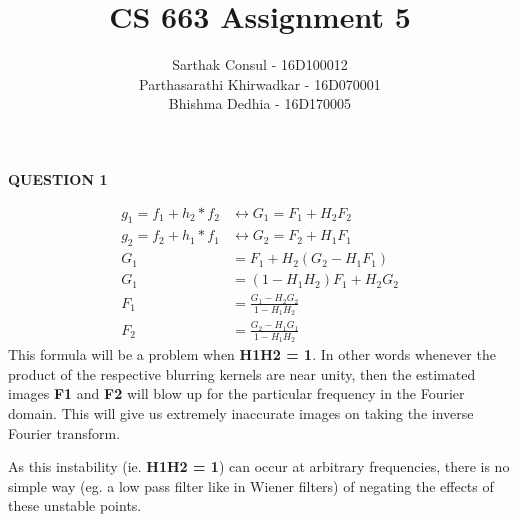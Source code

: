 \documentclass{article}
\title{CS 663 Assignment 5}
\author{Sarthak Consul - 16D100012\\
Parthasarathi Khirwadkar - 16D070001\\
Bhishma Dedhia - 16D170005}
\date{}
\begin{document}
\maketitle

\centerline{\textbf{\large\large{{{QUESTION 1}}}}}
\begin{align*}
    g_1 = f_1 + h_2*f_2 &\longleftrightarrow G_1 = F_1 + H_2F_2\\
    g_2 = f_2 + h_1*f_1 &\longleftrightarrow G_2 = F_2 + H_1F_1\\
    G_1 &= F_1 + H_2(G_2 - H_1F_1)\\
    G_1 &= (1-H_1H_2)F_1 + H_2G_2\\
    F_1 &= \frac{G_1 - H_2G_2}{1 - H_1H_2}\\
    F_2 &= \frac{G_2 - H_1G_1}{1 - H_1H_2}
\end{align*}
This formula will be a problem when \textbf{H1H2 = 1}. In other words whenever the product of the respective blurring kernels are near unity, then the estimated images \textbf{F1} and \textbf{F2} will blow up for the particular frequency in the Fourier domain. This will give us extremely inaccurate images on taking the inverse Fourier transform.

As this instability (ie. \textbf{H1H2 = 1}) can occur at arbitrary frequencies, there is no simple way (eg. a low pass filter like in Wiener filters) of negating the effects of these unstable points. 
\end{document}
